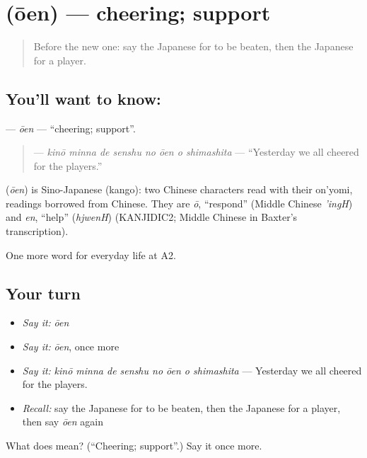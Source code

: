 \section[\texorpdfstring{\ja{おうえん} (ōen)}{おうえん (ōen)}]{ (ōen) — cheering; support}

\label{lesson:JA-C234-ouen}



\begin{quote}
Before the new one: say the Japanese for to be beaten, then the Japanese for a player.
\end{quote}

\subsection*{You'll want to know: }
\textbf{} — \emph{ōen} — \textquotedblleft{}cheering; support\textquotedblright{}.

\begin{quote}
\textbf{    } — \emph{kinō minna de senshu no ōen o shimashita} — \textquotedblleft{}Yesterday we all cheered for the players.\textquotedblright{}
\end{quote}

\begin{cousinweb}
\textbf{} (\emph{ōen}) is Sino-Japanese (kango): two Chinese characters read with their on'yomi, readings borrowed from Chinese. They are \emph{ō}, \textquotedblleft{}respond\textquotedblright{} (Middle Chinese \emph{'ingH}) and \emph{en}, \textquotedblleft{}help\textquotedblright{} (\emph{hjwenH}) (KANJIDIC2; Middle Chinese in Baxter's transcription).
\end{cousinweb}

\begin{grammarlens}[title={What you've built}]
One more word for everyday life at A2.
\end{grammarlens}

\subsection*{Your turn}
\begin{itemize}
\raggedright
  \item \emph{Say it:} \emph{ōen}
  \item \emph{Say it:} \emph{ōen}, once more
  \item \emph{Say it:} \emph{kinō minna de senshu no ōen o shimashita} — Yesterday we all cheered for the players.
  \item \emph{Recall:} say the Japanese for to be beaten, then the Japanese for a player, then say \emph{ōen} again
\end{itemize}

\begin{tcolorbox}[breakable,colback=teal!4,colframe=teal!35!black,title={Before you move on}]
What does  mean? (\textquotedblleft{}Cheering; support\textquotedblright{}.) Say it once more.
\end{tcolorbox}
